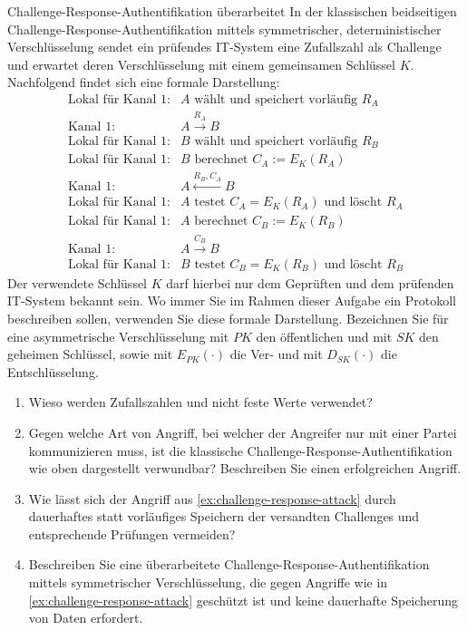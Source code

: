 \documentclass{article}
\begin{document}
\begin{exercise}{Challenge-Response-Authentifikation überarbeitet}
  In der klassischen beidseitigen Challenge-Response-Authentifikation mittels symmetrischer, deterministischer Verschlüsselung sendet ein prüfendes IT-System eine Zufallszahl als Challenge und erwartet deren Verschlüsselung mit einem gemeinsamen Schlüssel $K$. Nachfolgend findet sich eine formale Darstellung:
  \begin{align*}
    \text{Lokal für Kanal 1:} & A \text{ wählt und speichert vorläufig } R_A\\
    \text{Kanal 1:} & A \xrightarrow{R_A} B\\
    \text{Lokal für Kanal 1:} & B \text{ wählt und speichert vorläufig } R_B\\
    \text{Lokal für Kanal 1:} & B \text{ berechnet } C_A := E_K(R_A)\\
    \text{Kanal 1:} & A \xleftarrow{R_B, C_A} B\\
    \text{Lokal für Kanal 1:} & A \text{ testet } C_A = E_K(R_A) \text{ und löscht } R_A\\
    \text{Lokal für Kanal 1:} & A \text{ berechnet } C_B := E_K(R_B)\\
    \text{Kanal 1:} & A \xrightarrow{C_B} B\\
    \text{Lokal für Kanal 1:} & B \text{ testet } C_B = E_K(R_B) \text{ und löscht } R_B
  \end{align*}
  Der verwendete Schlüssel $K$ darf hierbei nur dem Geprüften und dem prüfenden IT-System bekannt sein. Wo immer Sie im Rahmen dieser Aufgabe ein Protokoll beschreiben sollen, verwenden Sie diese formale Darstellung. Bezeichnen Sie für eine asymmetrische Verschlüsselung mit $PK$ den öffentlichen und mit $SK$ den geheimen Schlüssel, sowie mit $E_{PK}(\cdot)$ die Ver- und mit $D_{SK}(\cdot)$ die Entschlüsselung.
  \begin{enumerate}
    \item Wieso werden Zufallszahlen und nicht feste Werte verwendet?
    \item\label{ex:challenge-response-attack} Gegen welche Art von Angriff, bei welcher der Angreifer nur mit einer Partei kommunizieren muss, ist die klassische Challenge-Response-Authentifikation wie oben dargestellt verwundbar? Beschreiben Sie einen erfolgreichen Angriff.
    \item Wie lässt sich der Angriff aus \ref{ex:challenge-response-attack} durch dauerhaftes statt vorläufiges Speichern der versandten Challenges und entsprechende Prüfungen vermeiden?
    \item Beschreiben Sie eine überarbeitete Challenge-Response-Authentifikation mittels symmetrischer Verschlüsselung, die gegen Angriffe wie in \ref{ex:challenge-response-attack} geschützt ist und keine dauerhafte Speicherung von Daten erfordert.

\end{enumerate}
\end{exercise}
\end{document}
